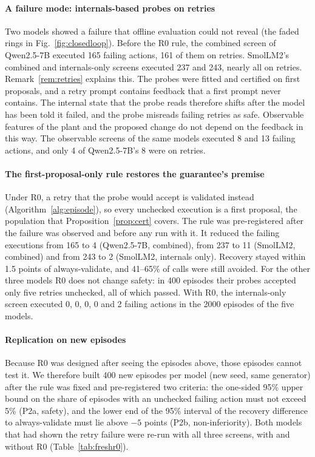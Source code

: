 \paragraph{A failure mode: internals-based probes on retries} Two models showed a failure that offline evaluation
could not reveal (the faded rings in Fig.~\ref{fig:closedloop}). Before the R0 rule, the combined screen of
Qwen2.5-7B executed 165 failing actions, 161 of them on retries. SmolLM2's combined and internals-only screens
executed 237 and 243, nearly all on retries. Remark~\ref{rem:retries} explains this. The probes were fitted and
certified on first proposals, and a retry prompt contains feedback that a first prompt never contains. The
internal state that the probe reads therefore shifts after the model has been told it failed, and the probe
misreads failing retries as safe. Observable features of the plant and the proposed change do not depend on the
feedback in this way. The observable screens of the same models executed 8 and 13 failing actions, and only 4 of
Qwen2.5-7B's 8 were on retries.

\paragraph{The first-proposal-only rule restores the guarantee's premise} Under R0, a retry that the probe would
accept is validated instead (Algorithm~\ref{alg:episode}), so every unchecked execution is a first proposal, the
population that Proposition~\ref{prop:cert} covers. The rule was pre-registered after the failure was observed and
before any run with it. It reduced the failing executions from 165 to 4 (Qwen2.5-7B, combined), from 237 to 11
(SmolLM2, combined) and from 243 to 2 (SmolLM2, internals only). Recovery stayed within 1.5 points of
always-validate, and 41--65\% of calls were still avoided. For the other three models R0 does not change safety:
in 400 episodes their probes accepted only five retries unchecked, all of which passed. With R0, the internals-only
screen executed 0, 0, 0, 0 and 2 failing actions in the 2000 episodes of the five models.

\paragraph{Replication on new episodes} Because R0 was designed after seeing the episodes above, those episodes
cannot test it. We therefore built 400 new episodes per model (new seed, same generator) after the rule was fixed
and pre-registered two criteria: the one-sided 95\% upper bound on the share of episodes with an unchecked failing
action must not exceed 5\% (P2a, safety), and the lower end of the 95\% interval of the recovery difference to
always-validate must lie above $-5$ points (P2b, non-inferiority). Both models that had shown the retry failure were
re-run with all three screens, with and without R0 (Table~\ref{tab:freshr0}).

